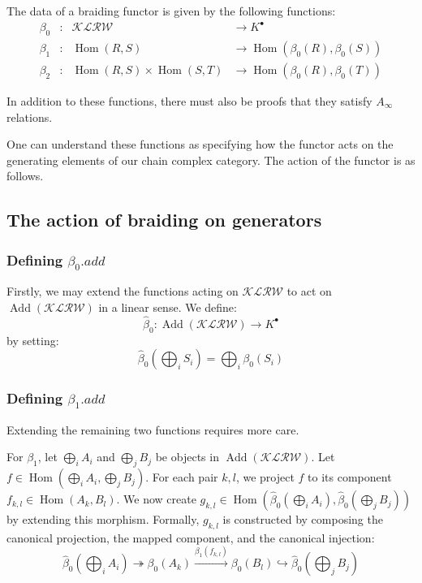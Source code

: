 The data of a braiding functor is given by the following functions:
$$
\begin{aligned}
\beta_0 &\colon & \mathcal{KLRW} &\to K^\bullet  \\
\beta_1 &\colon & \operatorname{Hom}(R,S) &\to \operatorname{Hom}(\beta_0(R), \beta_0(S)) \\
\beta_2 &\colon & \operatorname{Hom}(R,S) \times \operatorname{Hom}(S,T) &\to \operatorname{Hom}(\beta_0(R), \beta_0(T))
\end{aligned}
$$

In addition to these functions, there must also be proofs that they satisfy $A_\infty$ relations.

One can understand these functions as specifying how the functor acts on the generating elements of our chain complex category. The action of the functor is as follows.

\subsection{The action of braiding on generators}
\subsubsection{Defining $\beta_0.add$}
Firstly, we may extend the functions acting on $\mathcal{KLRW}$ to act on $\operatorname{Add}(\mathcal{KLRW})$ in a linear sense. We define:
$$\widehat{\beta}_0 \colon \operatorname{Add}(\mathcal{KLRW}) \to K^\bullet$$
by setting:
$$\widehat{\beta}_0\left(\bigoplus_i S_i\right) = \bigoplus_i \beta_0(S_i)$$

\subsubsection{Defining $\beta_1.add$}
Extending the remaining two functions requires more care.

For $\beta_1$, let $\bigoplus_i A_i$ and $\bigoplus_j B_j$ be objects in $\operatorname{Add}(\mathcal{KLRW})$. Let $f \in \operatorname{Hom}\left(\bigoplus_i A_i, \bigoplus_j B_j\right)$. For each pair $k, l$, we project $f$ to its component $f_{k,l} \in \operatorname{Hom}(A_k, B_l)$. We now create $g_{k,l} \in \operatorname{Hom}\left(\widehat{\beta}_0\left(\bigoplus_i A_i\right), \widehat{\beta}_0\left(\bigoplus_j B_j\right)\right)$ by extending this morphism. Formally, $g_{k,l}$ is constructed by composing the canonical projection, the mapped component, and the canonical injection:
$$\widehat{\beta}_0\left(\bigoplus_i A_i\right) \twoheadrightarrow {\beta}_0(A_k) \xrightarrow{\beta_1(f_{k,l})} {\beta}_0(B_l) \hookrightarrow \widehat{\beta}_0\left(\bigoplus_j B_j\right)$$

